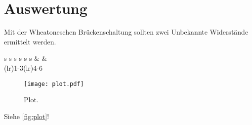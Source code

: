\section{Auswertung}
\label{sec:Auswertung}
Mit der Wheatoneschen Brückenschaltung sollten zwei Unbekannte Widerstände ermittelt werden.
\begin{table}
  \centering
  \caption{Messdaten der Widerstände $R_2$, $R_3$ und $R_4$, für $R_\text{x}$= Wert 10 und $R_\text{x}$= Wert 11}
  \begin{tabular}{s s s s s s}
    \toprule
    & & \\
    \cmidrule(lr){1-3}\cmidrule(lr){4-6}
    {}
    
  \end{tabular}
\end{table}
\begin{figure}
  \centering
  \texttt{[image: plot.pdf]}
  \caption{Plot.}
  \label{fig:plot}
\end{figure}


Siehe \autoref{fig:plot}!
